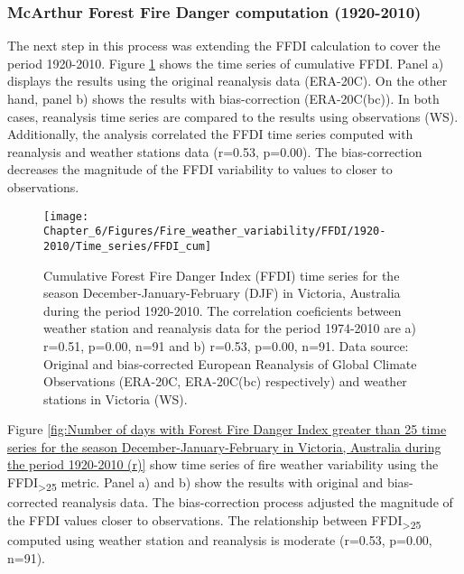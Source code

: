 \subsubsection{McArthur Forest Fire Danger computation (1920-2010)}

The next step in this process was extending the FFDI calculation to
cover the period 1920-2010. Figure \ref{fig:Cumulative Forest Fire Danger Index time series for the season December-January-February in Victoria, Australia during the period 1920-2010 (r)}
shows the time series of cumulative FFDI. Panel a) displays the results
using the original reanalysis data (ERA-20C). On the other hand, panel
b) shows the results with bias-correction (ERA-20C(bc)). In both cases,
reanalysis time series are compared to the results using observations
(WS). Additionally, the analysis correlated the FFDI time series computed
with reanalysis and weather stations data (r=0.53, p=0.00). The bias-correction
decreases the magnitude of the FFDI variability to values to closer
to observations.

\begin{figure}[h]
\noindent \begin{centering}
\texttt{[image: Chapter\_6/Figures/Fire\_weather\_variability/FFDI/1920-2010/Time\_series/FFDI\_cum]}
\par\end{centering}

\caption[Cumulative Forest Fire Danger Index (FFDI) time series for the season
December-January-February (DJF) in Victoria, Australia during the
period 1920-2010]{Cumulative Forest Fire Danger Index (FFDI) time series for the season
December-January-February (DJF) in Victoria, Australia during the
period 1920-2010. The correlation coeficients between weather station
and reanalysis data for the period 1974-2010 are a) r=0.51, p=0.00,
n=91 and b) r=0.53, p=0.00, n=91. Data source: Original and bias-corrected
European Reanalysis of Global Climate Observations (ERA-20C, ERA-20C(bc)
respectively) and weather stations in Victoria (WS). \label{fig:Cumulative Forest Fire Danger Index time series for the season December-January-February in Victoria, Australia during the period 1920-2010 (r)}}
\end{figure}


Figure \ref{fig:Number of days with Forest Fire Danger Index greater than 25 time series for the season December-January-February in Victoria, Australia during the period 1920-2010 (r)}
show time series of fire weather variability using the FFDI\textsubscript{>25}
metric. Panel a) and b) show the results with original and bias-corrected
reanalysis data. The bias-correction process adjusted the magnitude
of the FFDI values closer to observations. The relationship between
FFDI\textsubscript{>25} computed using weather station and reanalysis
is moderate (r=0.53, p=0.00, n=91).

